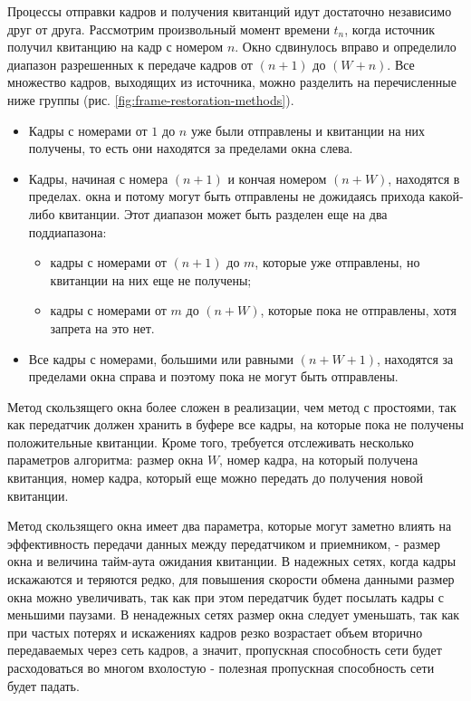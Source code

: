 Процессы отправки кадров и получения квитанций идут достаточно независимо друг от друга.
Рассмотрим произвольный момент времени $t_n$, когда источник получил квитанцию на кадр с номером $n$.
Окно сдвинулось вправо и определило диапазон разрешенных к передаче кадров от $(n + 1)$ до $(W + n)$.
Все множество кадров, выходящих из источника, можно разделить на перечисленные ниже группы (рис. \ref{fig:frame-restoration-methods}).
\begin{itemize}
    \item
        Кадры с номерами от $1$ до $n$ уже были отправлены и квитанции на них получены, то есть они находятся за пределами окна слева.

    \item
        Кадры, начиная с номера $(n + 1)$ и кончая номером $(n + W)$, находятся в пределах.
окна и потому могут быть отправлены не дожидаясь прихода какой-либо квитанции.
        Этот диапазон может быть разделен еще на два поддиапазона:
        \begin{itemize}
            \item кадры с номерами от $(n + 1)$ до $m$, которые уже отправлены, но квитанции на них еще не получены;
            \item кадры с номерами от $m$ до $(n + W)$, которые пока не отправлены, хотя запрета на это нет.
        \end{itemize}
    \item
        Все кадры с номерами, большими или равными $(n + W + 1)$, находятся за пределами окна справа и поэтому пока не могут быть отправлены.
\end{itemize}

Метод скользящего окна более сложен в реализации, чем метод с простоями, так как передатчик должен хранить в буфере все кадры, на которые пока не получены положительные квитанции.
Кроме того, требуется отслеживать несколько параметров алгоритма: размер окна $W$, номер кадра, на который получена квитанция, номер кадра, который еще можно передать до получения новой квитанции.

Метод скользящего окна имеет два параметра, которые могут заметно влиять на эффективность передачи данных между передатчиком и приемником, - размер окна и величина тайм-аута ожидания квитанции.
В надежных сетях, когда кадры искажаются и теряются редко, для повышения скорости обмена данными размер окна можно увеличивать, так как при этом передатчик будет посылать кадры с меньшими паузами.
В ненадежных сетях размер окна следует уменьшать, так как при частых потерях и искажениях кадров резко возрастает объем вторично передаваемых через сеть кадров, а значит, пропускная способность сети будет расходоваться во многом вхолостую - полезная пропускная способность сети будет падать.

